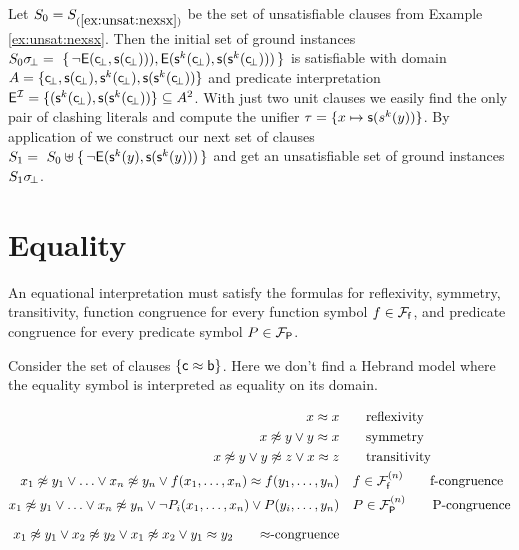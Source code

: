 \begin{example}\label{ex:unsat2}
Let $S_0 = S_{(\ref{ex:unsat:nexsx})}$ be the set of unsatisfiable clauses from Example \ref{ex:unsat:nexsx}. 
Then the initial set of ground instances 
$S_0\sigma\!_\bot =\
\{\,
{ \lnot{\mathsf{E}}({\mathsf c}\!_\bot, {\mathsf s}({\mathsf c}\!_\bot)))}, 
{ {\mathsf{E}}({\mathsf s}^k({\mathsf c}\!_\bot), {\mathsf s}({\mathsf s}^k({\mathsf c}\!_\bot)))}
\,\}$
is satisfiable with domain $A = \{ {\mathsf c}\!_\bot, {\mathsf s}({\mathsf c}\!_\bot), {\mathsf s}^k({\mathsf c}\!_\bot), {\mathsf s}({\mathsf s}^k({\mathsf c}\!_\bot)) \}$
and predicate interpretation 
${\mathsf{E}}^{\mathcal I} = \{ ({\mathsf s}^k({\mathsf c}\!_\bot), {\mathsf s}({\mathsf s}^k({\mathsf c}\!_\bot))
 \} \subseteq A^2$. 
% 
 With just two unit clauses we easily find the only pair of clashing literals and compute the unifier
 $\tau = \{ x\mapsto {\mathsf s}(s^k(y)) \}$. 
 By application of \InstGen we construct our next set of clauses
$
S_1 =\
S_0 \uplus
 \{\,
 { \lnot{\mathsf{E}}({\mathsf s}^k(y), {\mathsf s}({\mathsf s}^k(y)))}
 \,\}
 $ 
 and get an unsatisfiable set of ground instances $S_1\sigma\!_\bot$.
\end{example}




\section{Equality}



	An equational interpretation must satisfy the formulas for reflexivity, symmetry, transitivity, 
	function congruence for every function symbol $f\in{{\mathcal F}_{\mathsf f}}$, 
	and predicate congruence for every predicate symbol $P\in{{\mathcal F}_{\mathsf P}}$.

%

\begin{example}
	Consider the set of clauses $\{ {\mathsf c} \approx {\mathsf b} \}$. Here we don't find a Hebrand model where the equality symbol is interpreted as equality on its domain.
\end{example}

\begin{align*}
	 x \mEQ x & \tag*{reflexivity} \\
	x \mNE y \lor y \mEQ x & \tag*{symmetry}\\
	x\mNE y\lor y\mNE z\lor x\mEQ z & \tag*{transitivity} \\
	x_1 \mNE y_1\lor\ldots\lor x_n \mNE y_n\lor f(x_1,\ldots,x_n)\mEQ f(y_1,\ldots,y_n) &\quad f\in\mcFfn
	\tag*{f-congruence}
	\\
	x_1\mNE y_1\lor\ldots\lor x_n\mNE y_n\lor\lnot P_i(x_1,\ldots,x_n)\lor P(y_i,\ldots,y_n) &\quad P\in\mcFPn
	\tag*{P-congruence}
	\\[0.7em]
	x_1\mNE y_1\lor x_2\mNE y_2
	\lor x_1\mNE x_2
	\lor y_1\mEQ y_2
	\tag*{$\mEQ$-congruence}
\end{align*}

